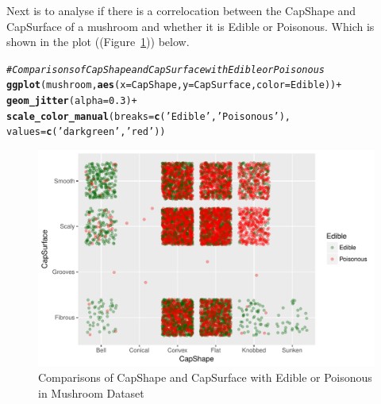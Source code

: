 \documentclass[10pt  ,usenames, dvipsnames]{article}\usepackage[]{graphicx}\usepackage[]{color}
\makeatletter
\newcommand{\hlnum}[1]{\textcolor[rgb]{0.686,0.059,0.569}{#1}}%
\newcommand{\hlstr}[1]{\textcolor[rgb]{0.192,0.494,0.8}{#1}}%
\newcommand{\hlcom}[1]{\textcolor[rgb]{0.678,0.584,0.686}{\textit{#1}}}%
\newcommand{\hlopt}[1]{\textcolor[rgb]{0,0,0}{#1}}%
\newcommand{\hlstd}[1]{\textcolor[rgb]{0.345,0.345,0.345}{#1}}%
\newcommand{\hlkwc}[1]{\textcolor[rgb]{0.333,0.667,0.333}{#1}}%
\newcommand{\hlkwd}[1]{\textcolor[rgb]{0.737,0.353,0.396}{\textbf{#1}}}%
\newenvironment{kframe}{%
 \def\at@end@of@kframe{}%
 \ifinner\ifhmode%
  \def\at@end@of@kframe{\end{minipage}}%
  \begin{minipage}{\columnwidth}%
 \fi\fi%
 \def\FrameCommand##1{\hskip\@totalleftmargin \hskip-\fboxsep
 \colorbox{shadecolor}{##1}\hskip-\fboxsep
     \hskip-\linewidth \hskip-\@totalleftmargin \hskip\columnwidth}%
 \MakeFramed {\advance\hsize-\width
   \@totalleftmargin\z@ \linewidth\hsize
   \@setminipage}}%
 {\par\unskip\endMakeFramed%
 \at@end@of@kframe}
\newenvironment{knitrout}{}{} %
\makeatother
\begin{document}
\clearpage

Next is to analyse if there is a correlocation between the CapShape and CapSurface of a mushroom and whether it is Edible or Poisonous. Which is shown in the plot ((Figure~\ref{fig2})) below.

\begin{knitrout}
\color{fgcolor}\begin{kframe}
\begin{alltt}
\hlcom{#Comparisons of CapShape and CapSurface with Edible or Poisonous}
\hlkwd{ggplot}\hlstd{(mushroom,}\hlkwd{aes}\hlstd{(}\hlkwc{x}\hlstd{=CapShape,} \hlkwc{y}\hlstd{=CapSurface,} \hlkwc{color}\hlstd{=Edible))} \hlopt{+}
                       \hlkwd{geom_jitter}\hlstd{(}\hlkwc{alpha}\hlstd{=}\hlnum{0.3}\hlstd{)} \hlopt{+}
                       \hlkwd{scale_color_manual}\hlstd{(}\hlkwc{breaks} \hlstd{=} \hlkwd{c}\hlstd{(}\hlstr{'Edible'}\hlstd{,}\hlstr{'Poisonous'}\hlstd{),}
                                          \hlkwc{values}\hlstd{=}\hlkwd{c}\hlstd{(}\hlstr{'darkgreen'}\hlstd{,}\hlstr{'red'}\hlstd{))}
\end{alltt}
\end{kframe}
\end{knitrout}



\begin{figure}[H]
\begin{center}
\begin{knitrout}
\color{fgcolor}
\includegraphics[width=.76\linewidth]{figure/unnamed-chunk-18-1} 

\end{knitrout}
\caption {Comparisons of CapShape and CapSurface with Edible or Poisonous in Mushroom Dataset}
\label{fig2}
\end {center}
\end {figure}
\end{document}
